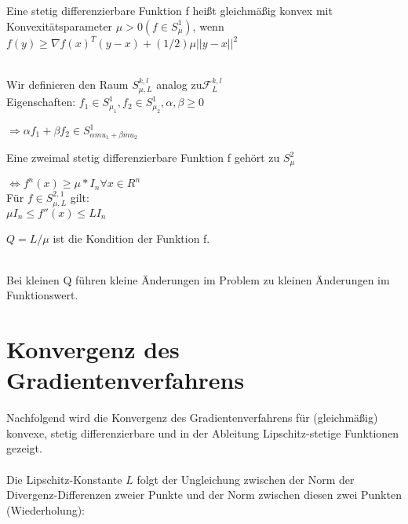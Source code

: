 \begin{Definition}
Eine stetig differenzierbare Funktion f heißt gleichmäßig konvex mit Konvexitätsparameter $\mu > 0 (f \in S_\mu^1)$, wenn $f(y) \geq \nabla f(x)^T (y-x) + (1/2) \mu ||y-x||^2 $
\end{Definition}\mbox{}\\ Wir definieren den Raum $S_{\mu,L}^{k,l}$ analog zu$ \mathcal{F}_L^{k,l} $\\
Eigenschaften:
$f_1 \in S_{\mu_1}^1, f_2 \in S_{\mu_2}^1, \alpha, \beta \geq 0 $

$\Rightarrow  \alpha f_1 + \beta f_2 \in S^{1}_{\alpha mu_1 + \beta mu_2}$


\begin{Lemma}
	Eine zweimal stetig differenzierbare Funktion f gehört zu $S^{2}_{\mu}$
\end{Lemma}

$\Leftrightarrow f^n(x) \geq \mu*I_n  \forall x \in R^n$\\
Für $f \in S_{\mu,L}^{2,1}$ gilt:\\
$\mu I_n \leq f''(x) \leq L I_n$

\begin{Definition}
$Q = L/\mu$ ist die Kondition der Funktion f.
\end{Definition}\mbox{}\\Bei kleinen Q führen kleine Änderungen im Problem zu kleinen Änderungen im Funktionswert.

	
\section{Konvergenz des Gradientenverfahrens}

Nachfolgend wird die Konvergenz des Gradientenverfahrens für (gleichmäßig) konvexe, stetig differenzierbare und in der Ableitung Lipschitz-stetige Funktionen gezeigt.\\\\
Die Lipschitz-Konstante $L$ folgt der Ungleichung zwischen der Norm der Divergenz-Differenzen zweier Punkte und der Norm zwischen diesen zwei Punkten (Wiederholung):


